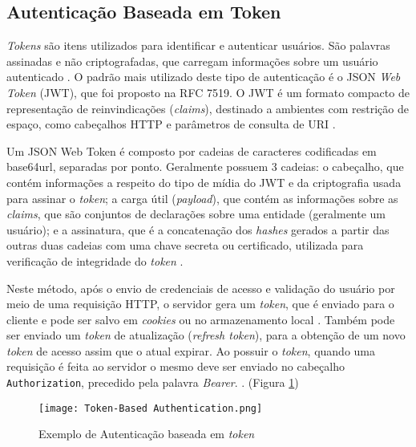 \subsection{Autenticação Baseada em Token}

\emph{Tokens} são itens utilizados para identificar e autenticar usuários. São palavras assinadas e 
não criptografadas, que carregam informações sobre um usuário autenticado \cite{BALAJ2017}. O 
padrão mais utilizado deste tipo de autenticação é o JSON \emph{Web Token} (JWT), que foi proposto
na RFC 7519. O JWT é um formato compacto de representação de reinvindicações (\emph{claims}), 
destinado a ambientes com restrição de espaço, como cabeçalhos HTTP e parâmetros de consulta de URI 
\cite{RFC7519}.

Um JSON Web Token é composto por cadeias de caracteres codificadas em base64url, separadas 
por ponto. Geralmente possuem 3 cadeias: o cabeçalho, que contém informações a respeito do tipo de mídia do 
JWT e da criptografia usada para assinar o \emph{token}; a carga útil (\emph{payload}), que contém 
as informações sobre as \emph{claims}, que são conjuntos de declarações sobre uma entidade 
(geralmente um usuário); e a assinatura, que é a concatenação dos \emph{hashes} gerados a partir das 
outras duas cadeias com uma chave secreta ou certificado, utilizada para verificação de integridade
do \emph{token} \cite{MONTANHEIRO2017}.

Neste método, após o envio de credenciais de acesso e validação do usuário por meio de uma 
requisição HTTP, o servidor gera um \emph{token}, que é enviado para o cliente e pode ser salvo
em \emph{cookies} ou no armazenamento local \cite{MONTANHEIRO2017}. Também pode ser enviado um 
\emph{token} de atualização (\emph{refresh token}), para a obtenção de um novo \emph{token} de acesso
assim que o atual expirar. Ao possuir o \emph{token}, quando uma requisição é feita ao servidor o 
mesmo deve ser enviado no cabeçalho \texttt{Authorization}, precedido pela palavra \emph{Bearer}. 
\cite{RFC6749}. (Figura \ref{fig:tokenAuth})

\begin{figure}[ht]
  \centering
  \texttt{[image: Token-Based Authentication.png]}
  \caption{Exemplo de Autenticação baseada em \emph{token}}
  \label{fig:tokenAuth}
\end{figure}

\

\
